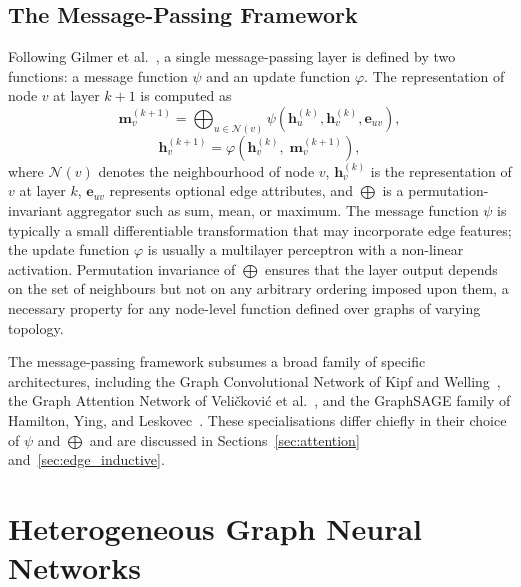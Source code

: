 \documentclass[%
    BCOR=10mm,
    DIV=13,
    toc=bibliography,
    toc=listof,
    oneside,
    12pt,
]{scrbook}
\begin{document}
\subsection{The Message-Passing Framework}
\label{subsec:mpnn}

Following Gilmer et al.~\cite{gilmer2017mpnn}, a single message-passing layer
is defined by two functions: a message function $\psi$ and an update function
$\varphi$. The representation of node $v$ at layer $k+1$ is computed as
\begin{equation}
  \mathbf{m}_v^{(k+1)} = \bigoplus_{u \in \mathcal{N}(v)}
    \psi\!\left( \mathbf{h}_u^{(k)}, \mathbf{h}_v^{(k)}, \mathbf{e}_{uv} \right),
  \label{eq:mpnn_agg}
\end{equation}
\begin{equation}
  \mathbf{h}_v^{(k+1)} = \varphi\!\left( \mathbf{h}_v^{(k)},\; \mathbf{m}_v^{(k+1)} \right),
  \label{eq:mpnn_update}
\end{equation}
where $\mathcal{N}(v)$ denotes the neighbourhood of node $v$,
$\mathbf{h}_v^{(k)}$ is the representation of $v$ at layer $k$,
$\mathbf{e}_{uv}$ represents optional edge attributes, and $\bigoplus$ is a
permutation-invariant aggregator such as sum, mean, or maximum. The message
function $\psi$ is typically a small differentiable transformation that may
incorporate edge features; the update function $\varphi$ is usually a
multilayer perceptron with a non-linear activation. Permutation invariance of
$\bigoplus$ ensures that the layer output depends on the set of neighbours but
not on any arbitrary ordering imposed upon them, a necessary property for
any node-level function defined over graphs of varying topology.

The message-passing framework subsumes a broad family of specific
architectures, including the Graph Convolutional Network of Kipf and
Welling~\cite{kipf2017gcn}, the Graph Attention Network of Veli\v{c}kovi\'{c}
et al.~\cite{velickovic2018gat}, and the GraphSAGE family of Hamilton, Ying,
and Leskovec~\cite{hamilton2017graphsage}. These specialisations differ
chiefly in their choice of $\psi$ and $\bigoplus$ and are discussed in
Sections~\ref{sec:attention} and~\ref{sec:edge_inductive}.

\section{Heterogeneous Graph Neural Networks}
\label{sec:heterogeneous_graphs}
\end{document}
